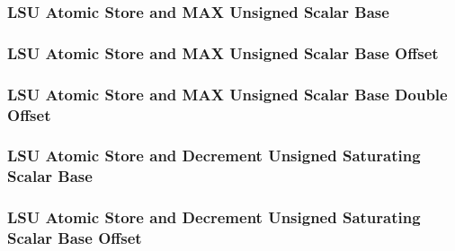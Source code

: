 

\subsubsection[{\small LSU Atomic Store and MAX Unsigned Scalar Base}]{LSU Atomic Store and MAX Unsigned Scalar Base} \label{sec:format-LSU-ASMAXUSB}



\subsubsection[{\small LSU Atomic Store and MAX Unsigned Scalar Base Offset}]{LSU Atomic Store and MAX Unsigned Scalar Base Offset} \label{sec:format-LSU-ASMAXUSB.O}



\subsubsection[{\small LSU Atomic Store and MAX Unsigned Scalar Base Double Offset}]{LSU Atomic Store and MAX Unsigned Scalar Base Double Offset} \label{sec:format-LSU-ASMAXUSB.D}



\subsubsection[{\small LSU Atomic Store and Decrement Unsigned Saturating Scalar Base}]{LSU Atomic Store and Decrement Unsigned Saturating Scalar Base} \label{sec:format-LSU-ASDUSSB}



\subsubsection[{\small LSU Atomic Store and Decrement Unsigned Saturating Scalar Base Offset}]{LSU Atomic Store and Decrement Unsigned Saturating Scalar Base Offset} \label{sec:format-LSU-ASDUSSB.O}

